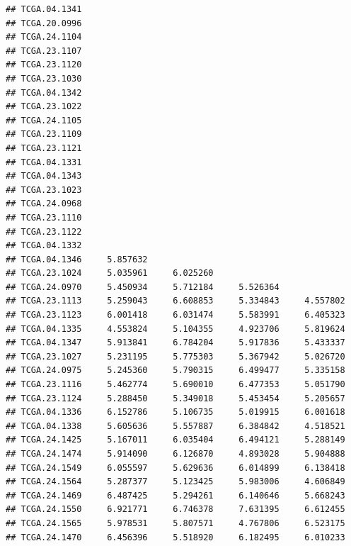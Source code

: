 \documentclass[UTF8]{beamer}\usepackage[]{graphicx}\usepackage[]{color}
\makeatletter
\newenvironment{kframe}{%
 \def\at@end@of@kframe{}%
 \ifinner\ifhmode%
  \def\at@end@of@kframe{\end{minipage}}%
  \begin{minipage}{\columnwidth}%
 \fi\fi%
 \def\FrameCommand##1{\hskip\@totalleftmargin \hskip-\fboxsep
 \colorbox{shadecolor}{##1}\hskip-\fboxsep
     \hskip-\linewidth \hskip-\@totalleftmargin \hskip\columnwidth}%
 \MakeFramed {\advance\hsize-\width
   \@totalleftmargin\z@ \linewidth\hsize
   \@setminipage}}%
 {\par\unskip\endMakeFramed%
 \at@end@of@kframe}
\newenvironment{knitrout}{}{} %
\makeatother
\begin{document}
\begin{frame}[fragile]
\begin{knitrout}
\begin{kframe}
\begin{verbatim}
## TCGA.04.1341                                                    
## TCGA.20.0996                                                    
## TCGA.24.1104                                                    
## TCGA.23.1107                                                    
## TCGA.23.1120                                                    
## TCGA.23.1030                                                    
## TCGA.04.1342                                                    
## TCGA.23.1022                                                    
## TCGA.24.1105                                                    
## TCGA.23.1109                                                    
## TCGA.23.1121                                                    
## TCGA.04.1331                                                    
## TCGA.04.1343                                                    
## TCGA.23.1023                                                    
## TCGA.24.0968                                                    
## TCGA.23.1110                                                    
## TCGA.23.1122                                                    
## TCGA.04.1332                                                    
## TCGA.04.1346     5.857632                                       
## TCGA.23.1024     5.035961     6.025260                          
## TCGA.24.0970     5.450934     5.712184     5.526364             
## TCGA.23.1113     5.259043     6.608853     5.334843     4.557802
## TCGA.23.1123     6.001418     6.031474     5.583991     6.405323
## TCGA.04.1335     4.553824     5.104355     4.923706     5.819624
## TCGA.04.1347     5.913841     6.784204     5.917836     5.433337
## TCGA.23.1027     5.231195     5.775303     5.367942     5.026720
## TCGA.24.0975     5.245360     5.790315     6.499477     5.335158
## TCGA.23.1116     5.462774     5.690010     6.477353     5.051790
## TCGA.23.1124     5.288450     5.349018     5.453454     5.205657
## TCGA.04.1336     6.152786     5.106735     5.019915     6.001618
## TCGA.04.1338     5.605636     5.557887     6.384842     4.518521
## TCGA.24.1425     5.167011     6.035404     6.494121     5.288149
## TCGA.24.1474     5.914090     6.126870     4.893028     5.904888
## TCGA.24.1549     6.055597     5.629636     6.014899     6.138418
## TCGA.24.1564     5.287377     5.123425     5.983006     4.606849
## TCGA.24.1469     6.487425     5.294261     6.140646     5.668243
## TCGA.24.1550     6.921771     6.746378     7.631395     6.612455
## TCGA.24.1565     5.978531     5.807571     4.767806     6.523175
## TCGA.24.1470     6.456396     5.518920     6.182495     6.010233

\end{verbatim}
\end{kframe}
\end{knitrout}
\end{frame}
\end{document}

